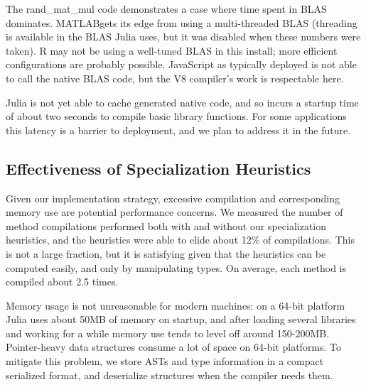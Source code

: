 \documentclass[9pt]{sigplanconf}
\newcommand{\Matlab}{MATLAB\textsuperscript{\tiny\textregistered}}
\begin{document}
The rand\_mat\_mul code demonstrates a case where time spent in BLAS \cite{blas}
dominates. \Matlab gets its edge from using a
multi-threaded BLAS (threading is available in the BLAS Julia uses,
but it was disabled when these numbers were taken). R may not be using
a well-tuned BLAS in this install; more efficient configurations are
probably possible.
JavaScript as typically deployed is not able to call the native BLAS code,
but the V8 compiler's work is respectable here.

Julia is not yet able to cache generated native code, and so incurs a
startup time of about two seconds to compile basic library functions.
For some applications this latency is a barrier to deployment, and we plan
to address it in the future.


\subsection{Effectiveness of Specialization Heuristics}

Given our implementation strategy, excessive compilation and corresponding
memory use are potential performance concerns.
We measured the number of method compilations performed both with and
without our specialization heuristics, and
the heuristics were able to elide about 12\% of compilations. This is
not a large fraction, but it is satisfying given that the heuristics can
be computed easily, and only by manipulating types. On average, each
method is compiled about 2.5 times.


Memory usage is not unreasonable for modern machines: on a 64-bit platform
Julia uses about 50MB of memory on startup, and after loading several
libraries and working for a while memory use tends to level off around
150-200MB. Pointer-heavy data structures consume a lot of space on
64-bit platforms. To mitigate this problem, we store ASTs and type
information in a compact serialized format, and deserialize structures
when the compiler needs them.
\end{document}
